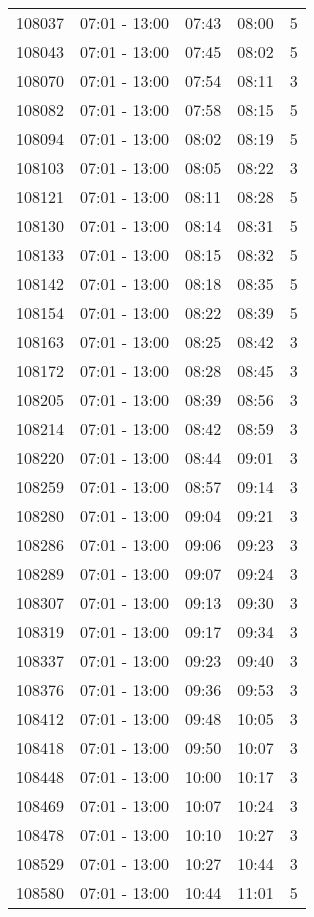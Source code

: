 \documentclass{article}
\begin{document}
\begin{tabular}{llccc}
108037 & 07:01 - 13:00 & 07:43 & 08:00 & 5 \\
108043 & 07:01 - 13:00 & 07:45 & 08:02 & 5 \\
108070 & 07:01 - 13:00 & 07:54 & 08:11 & 3 \\
108082 & 07:01 - 13:00 & 07:58 & 08:15 & 5 \\
108094 & 07:01 - 13:00 & 08:02 & 08:19 & 5 \\
108103 & 07:01 - 13:00 & 08:05 & 08:22 & 3 \\
108121 & 07:01 - 13:00 & 08:11 & 08:28 & 5 \\
108130 & 07:01 - 13:00 & 08:14 & 08:31 & 5 \\
108133 & 07:01 - 13:00 & 08:15 & 08:32 & 5 \\
108142 & 07:01 - 13:00 & 08:18 & 08:35 & 5 \\
108154 & 07:01 - 13:00 & 08:22 & 08:39 & 5 \\
108163 & 07:01 - 13:00 & 08:25 & 08:42 & 3 \\
108172 & 07:01 - 13:00 & 08:28 & 08:45 & 3 \\
108205 & 07:01 - 13:00 & 08:39 & 08:56 & 3 \\
108214 & 07:01 - 13:00 & 08:42 & 08:59 & 3 \\
108220 & 07:01 - 13:00 & 08:44 & 09:01 & 3 \\
108259 & 07:01 - 13:00 & 08:57 & 09:14 & 3 \\
108280 & 07:01 - 13:00 & 09:04 & 09:21 & 3 \\
108286 & 07:01 - 13:00 & 09:06 & 09:23 & 3 \\
108289 & 07:01 - 13:00 & 09:07 & 09:24 & 3 \\
108307 & 07:01 - 13:00 & 09:13 & 09:30 & 3 \\
108319 & 07:01 - 13:00 & 09:17 & 09:34 & 3 \\
108337 & 07:01 - 13:00 & 09:23 & 09:40 & 3 \\
108376 & 07:01 - 13:00 & 09:36 & 09:53 & 3 \\
108412 & 07:01 - 13:00 & 09:48 & 10:05 & 3 \\
108418 & 07:01 - 13:00 & 09:50 & 10:07 & 3 \\
108448 & 07:01 - 13:00 & 10:00 & 10:17 & 3 \\
108469 & 07:01 - 13:00 & 10:07 & 10:24 & 3 \\
108478 & 07:01 - 13:00 & 10:10 & 10:27 & 3 \\
108529 & 07:01 - 13:00 & 10:27 & 10:44 & 3 \\
108580 & 07:01 - 13:00 & 10:44 & 11:01 & 5 \\

\end{tabular}
\end{document}
